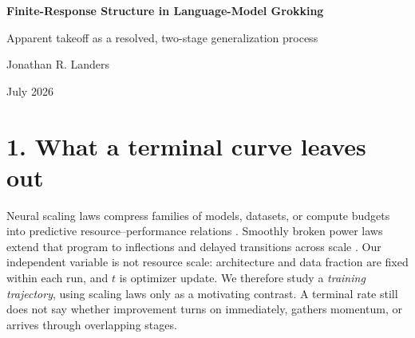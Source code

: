 \documentclass[10pt]{article}
\theoremstyle{compact}
\begin{document}
\begin{center}
{\Large\bfseries Finite-Response Structure in Language-Model Grokking}\par
\vspace{0.32em}
{\large Apparent takeoff as a resolved, two-stage generalization process}\par
\vspace{0.52em}
{Jonathan R. Landers}\par
\vspace{0.12em}
{July 2026}
\end{center}
\vspace{0.1em}

\begin{abstract}
Resource scaling laws vary model size, data, or compute. We study a different
object: the optimization-time path of delayed generalization in a small causal
Transformer. The cumulative arrival of improvement is a step response \(F_t\),
and its finite difference \(\kappa_t\) is a response kernel. A delta kernel is
instantaneous; a broad or multilobed kernel carries temporal structure that a
terminal exponent or changepoint cannot retain. Across six independent seeds
on modular addition, the late rise from 50 to 90 percent held-out accuracy occupies
600--1,250 optimizer updates, or 12--25 resolved checkpoint intervals. More
strikingly, a basis-free valley theorem rejects every single unimodal response
kernel on checkpoints withheld from selecting the valley, in all six seeds.
A two-response mixture then predicts those held-out checkpoints better than
either a step or one smooth response in every seed. Roughly 30 percent of the
fitted response arrives in an early component and 70 percent in a later,
sharper component. Apparent takeoff is therefore the second lobe of a longer
response. A separate modal test finds no need for two exponential settling
modes, so multiplicity of the transition does not yet identify two physical
mechanisms.
\end{abstract}

\section*{1. What a terminal curve leaves out}

Neural scaling laws compress families of models, datasets, or compute budgets
into predictive resource--performance relations \cite{kaplan2020,hoffmann2022}.
Smoothly broken power laws extend that program to inflections and delayed
transitions across scale \cite{caballero2023}. Our independent variable is not
resource scale: architecture and data fraction are fixed within each run, and
\(t\) is optimizer update. We therefore study a \emph{training trajectory},
using scaling laws only as a motivating contrast. A terminal rate still does
not say whether improvement turns on immediately, gathers momentum, or arrives
through overlapping stages.
\end{document}
